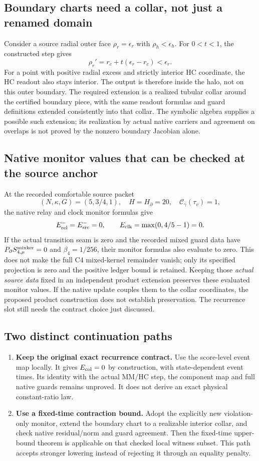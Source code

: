 \documentclass[11pt,a4paper]{article}
\begin{document}
\subsection{Boundary charts need a collar, not just a renamed domain}
Consider a source radial outer face $\rho_r=\epsilon_r$ with
$\rho_h<\epsilon_h$. For $0<t<1$, the constructed step gives
\[
\rho_r'=r_c+t(\epsilon_r-r_c)<\epsilon_r.
\]
For a point with positive radial excess and strictly interior HC coordinate,
the HC readout also stays interior. The output is therefore inside the halo,
not on this outer boundary. The required extension is a realized tubular
collar around the certified boundary piece, with the same readout formulas
and guard definitions extended consistently into that collar.
The symbolic algebra supplies a possible such extension; its realization
by actual native carriers and agreement on overlaps is not proved by the
nonzero boundary Jacobian alone.

\subsection{Native monitor values that can be checked at the source anchor}
At the recorded comfortable source packet
\[
(N,\kappa,G)=(5,3/4,1),\quad H=H_\partial=20,
\quad\mathcal C_\gamma(\tau_v)=1,
\]
the native relay and clock monitor formulas give
\[
E_{\rm rel}^{-}=E_{\rm src}^{-}=0,
\qquad E_{\rm clk}=\max(0,4/5-1)=0.
\]
If the actual transition seam is zero and the recorded mixed guard data
have $P_\partial S_{4,\mu}^{\rm mixker}=0$ and $\beta_4=1/256$, their
monitor formulas also evaluate to zero. This does not make the full C4
mixed-kernel remainder vanish; only its specified projection is zero and
the positive ledger bound is retained.
Keeping those \emph{actual source data} fixed in an independent product
extension preserves these evaluated monitor values. If the native update
couples them to the collar coordinates, the proposed product construction
does not establish preservation. The recurrence slot still needs the
contract choice just discussed.

\subsection{Two distinct continuation paths}
\begin{enumerate}
\item \textbf{Keep the original exact recurrence contract.} Use the
score-level event map locally. It gives $E_{\rm col}=0$ by construction,
with state-dependent event times. Its identity with the actual MM/HC step,
the component map and full native guards remains unproved. It does not
derive an exact physical constant-ratio law.
\item \textbf{Use a fixed-time contraction bound.} Adopt the explicitly
new violation-only monitor, extend the boundary chart to a realizable
interior collar, and check native residual/norm and guard agreement.
Then the fixed-time upper-bound theorem is applicable on that checked
local witness subset. This path accepts stronger lowering instead of
rejecting it through an equality penalty.
\end{enumerate}
\end{document}
